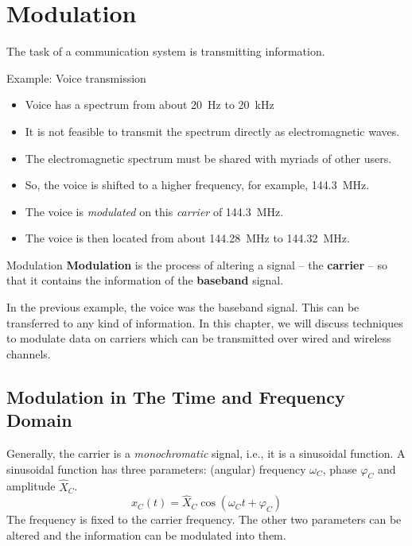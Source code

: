 %
%
%

\chapter{Modulation}

\begin{refsection}
	
The task of a communication system is transmitting information.

Example: Voice transmission
\begin{itemize}
	\item Voice has a spectrum from about \SI{20}{Hz} to \SI{20}{kHz}
	\item It is not feasible to transmit the spectrum directly as electromagnetic waves.
	\item The electromagnetic spectrum must be shared with myriads of other users.
	\item So, the voice is shifted to a higher frequency, for example, \SI{144.3}{MHz}.
	\item The voice is \emph{modulated} on this \emph{carrier} of \SI{144.3}{MHz}.
	\item The voice is then located from about \SI{144.28}{MHz} to \SI{144.32}{MHz}.
\end{itemize}

\begin{definition}{Modulation}
	 \textbf{Modulation} is the process of altering a signal -- the  \textbf{carrier} -- so that it contains the information of the  \textbf{baseband} signal.
\end{definition}

In the previous example, the voice was the baseband signal. This can be transferred to any kind of information. In this chapter, we will discuss techniques to modulate data on carriers which can be transmitted over wired and wireless channels.

\section{Modulation in The Time and Frequency Domain}

Generally, the carrier is a \emph{monochromatic} signal, i.e., it is a sinusoidal function. A sinusoidal function has three parameters: (angular) frequency $\omega_C$, phase $\varphi_C$ and amplitude $\hat{X}_C$.
\begin{equation}
	x_C(t) = \hat{X}_C \cos\left(\omega_C t + \varphi_C\right)
\end{equation}
The frequency is fixed to the carrier frequency. The other two parameters can be altered and the information can be modulated into them.


\end{refsection}
